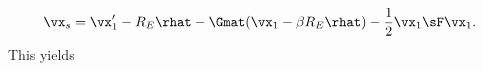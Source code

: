 \begin{equation}
\vx_s = \vx'_1 - R_E \rhat - \Gmat(\vx_1 - \beta R_E \rhat) - \frac{1}{2} \vx_1 \sF \vx_1.
\end{equation}
This yields
